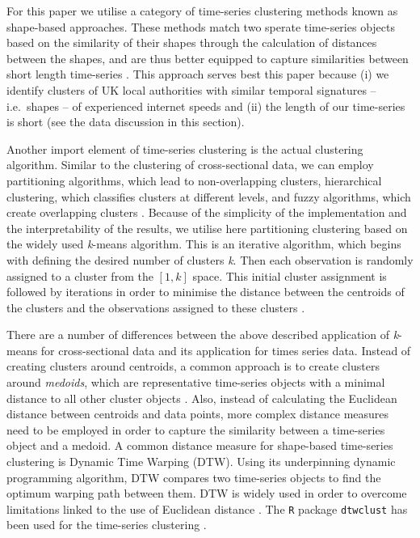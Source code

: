 \documentclass[Royal,times,sageh]{sagej}
\begin{document}
For this paper we utilise a category of time-series clustering methods
known as shape-based approaches. These methods match two sperate
time-series objects based on the similarity of their shapes through the
calculation of distances between the shapes, and are thus better
equipped to capture similarities between short length time-series
\citep{aghabozorgi2015time}. This approach serves best this paper
because (i) we identify clusters of UK local authorities with similar
temporal signatures -- i.e.~shapes -- of experienced internet speeds and
(ii) the length of our time-series is short (see the data discussion in
this section).

Another import element of time-series clustering is the actual
clustering algorithm. Similar to the clustering of cross-sectional data,
we can employ partitioning algorithms, which lead to non-overlapping
clusters, hierarchical clustering, which classifies clusters at
different levels, and fuzzy algorithms, which create overlapping
clusters \citep{sardatime}. Because of the simplicity of the
implementation and the interpretability of the results, we utilise here
partitioning clustering based on the widely used \emph{k}-means
algorithm. This is an iterative algorithm, which begins with defining
the desired number of clusters \emph{k}. Then each observation is
randomly assigned to a cluster from the \([1,k]\) space. This initial
cluster assignment is followed by iterations in order to minimise the
distance between the centroids of the clusters and the observations
assigned to these clusters \citep{james2013introduction}.

There are a number of differences between the above described
application of \emph{k}-means for cross-sectional data and its
application for times series data. Instead of creating clusters around
centroids, a common approach is to create clusters around
\emph{medoids}, which are representative time-series objects with a
minimal distance to all other cluster objects \citep{sardatime}. Also,
instead of calculating the Euclidean distance between centroids and data
points, more complex distance measures need to be employed in order to
capture the similarity between a time-series object and a medoid. A
common distance measure for shape-based time-series clustering is
Dynamic Time Warping (DTW). Using its underpinning dynamic programming
algorithm, DTW compares two time-series objects to find the optimum
warping path between them. DTW is widely used in order to overcome
limitations linked to the use of Euclidean distance
\citep{sardatime, berndt1994using, ratanamahatana2004everything}. The
\texttt{R} package \texttt{dtwclust} has been used for the time-series
clustering \citep{dtwclust}.
\end{document}
